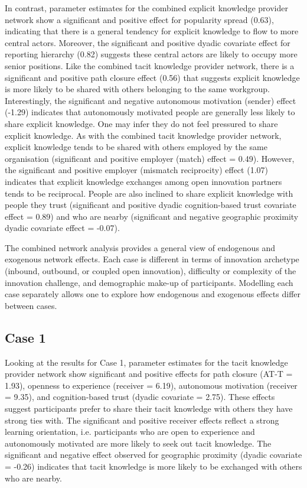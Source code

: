 In contrast, parameter estimates for the combined explicit knowledge provider network show a significant and positive effect for popularity spread (0.63), indicating that there is a general tendency for explicit knowledge to flow to more central actors. Moreover, the significant and positive dyadic covariate effect for reporting hierarchy (0.82) suggests these central actors are likely to occupy more senior positions. Like the combined tacit knowledge provider network, there is a significant and positive path closure effect (0.56) that suggests explicit knowledge is more likely to be shared with others belonging to the same workgroup. Interestingly, the significant and negative autonomous motivation (sender) effect (-1.29) indicates that autonomously motivated people are generally less likely to share explicit knowledge. One may infer they do not feel pressured to share explicit knowledge. As with the combined tacit knowledge provider network, explicit knowledge tends to be shared with others employed by the same organisation (significant and positive employer (match) effect = 0.49). However, the significant and positive employer (mismatch reciprocity) effect (1.07) indicates that explicit knowledge exchanges among open innovation partners tends to be reciprocal. People are also inclined to share explicit knowledge with people they trust (significant and positive dyadic cognition-based trust covariate effect = 0.89) and who are nearby (significant and negative geographic proximity dyadic covariate effect = -0.07). \medskip

The combined network analysis provides a general view of endogenous and exogenous network effects. Each case is different in terms of innovation archetype (inbound, outbound, or coupled open innovation), difficulty or complexity of the innovation challenge, and demographic make-up of participants. Modelling each case separately allows one to explore how endogenous and exogenous effects differ between cases.

\subsection{Case 1}

Looking at the results for Case 1, parameter estimates for the tacit knowledge provider network show significant and positive effects for path closure (AT-T = 1.93), openness to experience (receiver = 6.19), autonomous motivation (receiver = 9.35), and cognition-based trust (dyadic covariate = 2.75). These effects suggest participants prefer to share their tacit knowledge with others they have strong ties with. The significant and positive receiver effects reflect a strong learning orientation, i.e. participants who are open to experience and autonomously motivated are more likely to seek out tacit knowledge. The significant and negative effect observed for geographic proximity (dyadic covariate = -0.26) indicates that tacit knowledge is more likely to be exchanged with others who are nearby.  \medskip

